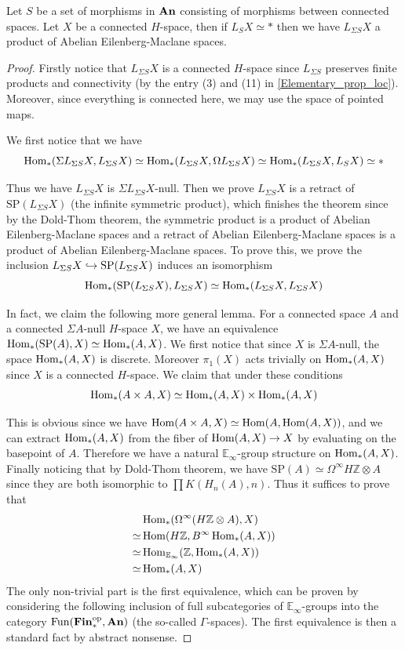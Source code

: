 	\begin{lemma}\label{Susp_loc_prod_EM}
		Let $S$ be a set of morphisms in $\mathbf{An}$ consisting of morphisms between connected spaces. Let $X$ be a connected $H$-space, then if $L_SX\simeq*$ then we have $L_{\Sigma S}X$ a product of Abelian Eilenberg-Maclane spaces. 
	\end{lemma}
	\begin{proof}
		Firstly notice that $L_{\Sigma S}X$ is a connected $H$-space since $L_{\Sigma S}$ preserves finite products and connectivity (by the entry (3) and (11) in \cref{Elementary_prop_loc}). Moreover, since everything is connected here, we may use the space of pointed maps. 

		We first notice that we have 
		\[ \operatorname{\mathrm{Hom}}_*(\Sigma L_{\Sigma S}X,L_{\Sigma S}X)\simeq\operatorname{\mathrm{Hom}}_*(L_{\Sigma S}X,\Omega L_{\Sigma S}X)\simeq\operatorname{\mathrm{Hom}}_*(L_{\Sigma S}X,L_SX)\simeq* \]

		Thus we have $L_{\Sigma S}X$ is $\Sigma L_{\Sigma S}X$-null. Then we prove $L_{\Sigma S}X$ is a retract of $\mathrm{SP}(L_{\Sigma S}X)$ (the infinite symmetric product), which finishes the theorem since by the Dold-Thom theorem, the symmetric product is a product of Abelian Eilenberg-Maclane spaces and a retract of Abelian Eilenberg-Maclane spaces is a product of Abelian Eilenberg-Maclane spaces. To prove this, we prove the inclusion $L_{\Sigma S}X\hookrightarrow\mathrm{SP}(L_{\Sigma S}X)$ induces an isomorphism 
		\[ \operatorname{\mathrm{Hom}}_*(\mathrm{SP}(L_{\Sigma S}X),L_{\Sigma S}X)\simeq\operatorname{\mathrm{Hom}}_*(L_{\Sigma S}X,L_{\Sigma S}X) \]

		In fact, we claim the following more general lemma. For a connected space $A$ and a connected $\Sigma A$-null $H$-space $X$, we have an equivalence $\operatorname{\mathrm{Hom}}_*(\mathrm{SP}(A),X)\simeq\operatorname{\mathrm{Hom}}_*(A,X)$. We first notice that since $X$ is $\Sigma A$-null, the space $\operatorname{\mathrm{Hom}}_*(A,X)$ is discrete. Moreover $\pi_1(X)$ acts trivially on $\operatorname{\mathrm{Hom}}_*(A,X)$ since $X$ is a connected $H$-space. We claim that under these conditions 
		\[ \operatorname{\mathrm{Hom}}_*(A\times A,X)\simeq\operatorname{\mathrm{Hom}}_*(A,X)\times\operatorname{\mathrm{Hom}}_*(A,X) \]

		This is obvious since we have $\operatorname{\mathrm{Hom}}(A\times A,X)\simeq\operatorname{\mathrm{Hom}}(A,\operatorname{\mathrm{Hom}}(A,X))$, and we can extract $\operatorname{\mathrm{Hom}}_*(A,X)$ from the fiber of $\operatorname{\mathrm{Hom}}(A,X)\to X$ by evaluating on the basepoint of $A$. Therefore we have a natural $\mathbb{E}_\infty$-group structure on $\operatorname{\mathrm{Hom}}_*(A,X)$. 
		Finally noticing that by Dold-Thom theorem, we have $\mathrm{SP}(A)\simeq\Omega^\infty H\mathbb{Z}\otimes A$ since they are both isomorphic to $\prod K(H_n(A),n)$. Thus it suffices to prove that 
		\begin{align*}
			&\operatorname{\mathrm{Hom}}_*(\Omega^\infty(H\mathbb{Z}\otimes A),X) \\
			\simeq&\operatorname{\mathrm{Hom}}(H\mathbb{Z},B^\infty\operatorname{\mathrm{Hom}}_*(A,X)) \\
			\simeq&\operatorname{\mathrm{Hom}}_{\mathbb{E}_\infty}(\mathbb{Z},\operatorname{\mathrm{Hom}}_*(A,X)) \\
			\simeq&\operatorname{\mathrm{Hom}}_*(A,X)
		\end{align*}
		The only non-trivial part is the first equivalence, which can be proven by considering the following inclusion of full subcategories of $\mathbb{E}_\infty$-groups into the category $\operatorname{\mathrm{Fun}}(\mathbf{Fin}_*^{\operatorname{\mathrm{op}}},\mathbf{An})$ (the so-called $\Gamma$-spaces). The first equivalence is then a standard fact by abstract nonsense. 
	\end{proof}

